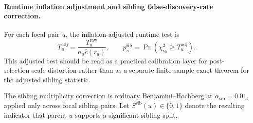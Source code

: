 \paragraph{Runtime inflation adjustment and sibling false-discovery-rate correction.}
For each focal pair $u$, the inflation-adjusted runtime test is
\begin{equation}
T_u^{\mathrm{adj}} = \frac{T_u^{\mathrm{raw}}}{a_u\hat{c}(z_u)},
\qquad
p_u^{\mathrm{sib}}
=
\Pr\!\left(\chi^2_{\nu_u} \ge T_u^{\mathrm{adj}}\right).
\end{equation}
This adjusted test should be read as a practical calibration layer for
post-selection scale distortion rather than as a
separate finite-sample exact theorem for the adjusted sibling statistic.

The sibling multiplicity correction is ordinary
Benjamini--Hochberg \citep{benjamini1995controlling} at
$\alpha_{\mathrm{sib}} = 0.01$, applied only across focal sibling pairs. Let
$S^{\mathrm{sib}}(u) \in \{0,1\}$ denote the resulting indicator that parent
$u$ supports a significant sibling split.
